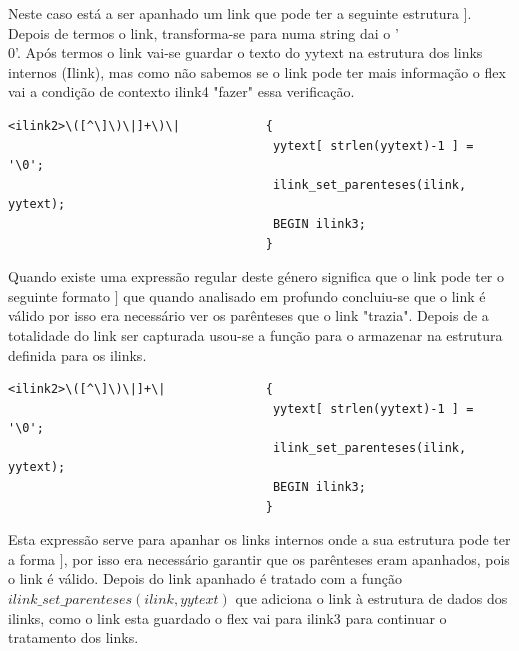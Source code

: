 \documentclass[11pt, a4paper, oneside]{article}
\begin{document}
Neste caso está a ser apanhado um link que pode ter a seguinte estrutura \begin{math}[[Opacity (optics)]]\end{math}. Depois de termos o link,  transforma-se para numa string dai o '\\0'.
Após termos o link vai-se guardar o texto do yytext na estrutura dos links internos (Ilink), mas como não sabemos se o link pode ter mais informação o flex vai a condição de contexto ilink4 "fazer" essa verificação. 

\begin{verbatim}
<ilink2>\([^\]\)\|]+\)\|            {
                                     yytext[ strlen(yytext)-1 ] = '\0';
                                     ilink_set_parenteses(ilink, yytext);
                                     BEGIN ilink3;
                                    }
\end{verbatim}
Quando existe uma expressão regular deste género significa que o link pode ter o seguinte formato \begin{math}[[Opacity ((optics))|]]\end{math} que quando analisado em profundo concluiu-se que o link é válido por isso era necessário ver os parênteses que o link "trazia".
Depois de a totalidade do link ser capturada usou-se a função para o armazenar na estrutura definida para os ilinks.

\begin{verbatim}
<ilink2>\([^\]\)\|]+\|              {
                                     yytext[ strlen(yytext)-1 ] = '\0';
                                     ilink_set_parenteses(ilink, yytext);
                                     BEGIN ilink3;
                                    }
\end{verbatim}

Esta expressão serve para apanhar os links internos onde a sua estrutura pode ter a forma \begin{math}[[Opacity ((optics|]]\end{math}, por isso era necessário garantir que os parênteses eram apanhados, pois o link é válido. 
Depois do link apanhado é tratado com a função \begin{math} ilink\_set\_parenteses(ilink, yytext)\end{math} que adiciona o link à estrutura de dados dos ilinks, como o link esta guardado o flex vai para ilink3 para continuar o tratamento dos links.
\end{document}
